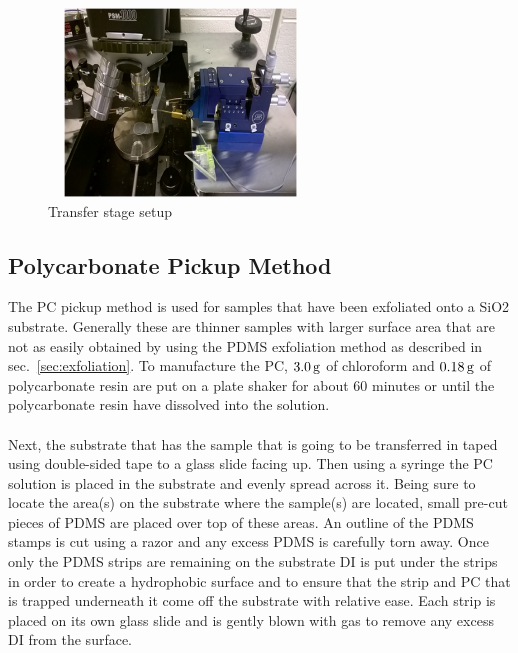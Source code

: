 \begin{figure}[ht]
	\centering
	\includegraphics[height=5cm,width=7cm]{figs/experimental/transfer_stage_setup}
	\caption[Transfer stage setup]{Transfer stage setup}
	\label{fig:transfer_stage_setup}
\end{figure}
\subsection{Polycarbonate Pickup Method}\label{subsec:pc_pickup}
The PC pickup method is used for samples that have been exfoliated onto a \acs{SiO2} substrate. Generally these are thinner samples with larger surface area that are not as easily obtained by using the PDMS exfoliation method as described in sec.~\ref{sec:exfoliation}. To manufacture the PC, $3.0\,\mathrm{g}$ of chloroform and $0.18\,\mathrm{g}$ of polycarbonate resin are put on a plate shaker for about 60 minutes or until the polycarbonate resin have dissolved into the solution. \\ \\
\noindent Next, the substrate that has the sample that is going to be transferred in taped using double-sided tape to a glass slide facing up. Then using a syringe the \acs{PC} solution is placed in the substrate and evenly spread across it. Being sure to locate the area(s) on the substrate where the sample(s) are located, small pre-cut pieces of PDMS are placed over top of these areas. An outline of the \acs{PDMS} stamps is cut using a razor and any excess \acs{PDMS} is carefully torn away. Once only the \acs{PDMS} strips are remaining on the substrate \ac{DI} is put under the strips in order to create a hydrophobic surface and to ensure that the strip and PC that is trapped underneath it come off the substrate with relative ease. Each strip is placed on its own glass slide and is gently blown with  gas to remove any excess \acs{DI} from the surface. \\ \\
